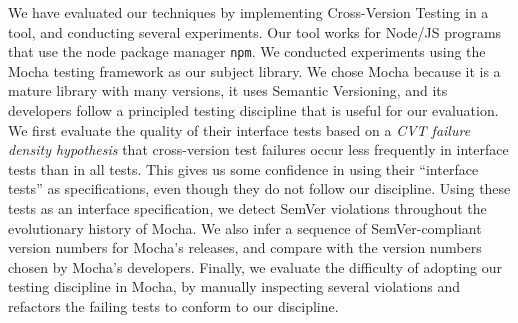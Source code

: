 


We have evaluated our techniques by implementing Cross-Version Testing
in a tool, and conducting several experiments. 
%
Our tool works for Node/JS programs that use the node package manager
{\tt npm}.
%
We conducted experiments using the Mocha testing framework as our
subject library. We chose Mocha because it is a mature library with
many versions, it uses Semantic Versioning, and its developers follow
a principled testing discipline that is useful for our evaluation.
%
We first evaluate the quality of their interface tests based on a {\em
  CVT failure density hypothesis} that cross-version test failures
occur less frequently in interface tests than in all tests. This gives
us some confidence in using their ``interface tests'' as
specifications, even though they do not follow our discipline.
%
Using these tests as an interface specification, we detect SemVer
violations throughout the evolutionary history of Mocha.
%
We also infer a sequence of SemVer-compliant version numbers for
Mocha's releases, and compare with the version numbers chosen by
Mocha's developers.
%
Finally, we evaluate the difficulty of adopting our testing discipline
in Mocha, by manually inspecting several violations and refactors the
failing tests to conform to our discipline.

